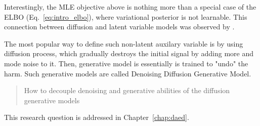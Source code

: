 Interestingly, the MLE objective above is nothing more than a special case of the ELBO (Eq.~\ref{eq:intro_elbo}), where variational posterior is not learnable. This connection between diffusion and latent variable models was observed by \citet{huang2021variational, kingma2021variational, tzen2019neural}.

The most popular way to define such non-latent auxilary variable is by using diffusion process, which gradually destroys the initial signal by adding more and mode noise to it. Then, generative model is essentially is trained to "undo" the harm. Such generative models are called Denoising Diffusion Generative Model.

\begin{quote}
	How  to decouple denoising and generative abilities of the diffusion generative models
\end{quote}
This research question is addressed in Chapter~\ref{chap:daed}.


